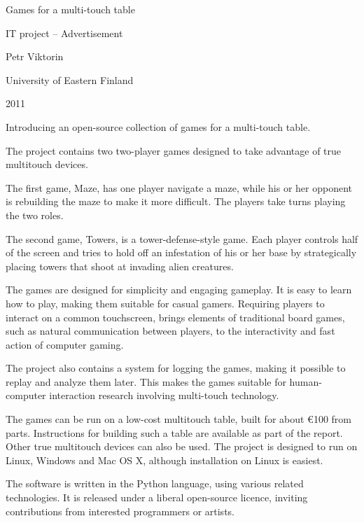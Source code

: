 \documentclass[a4paper,12pt]{article}
\begin{document}
\vspace*{3cm}

\begin{center}
{
    \huge Games for a multi-touch table

    \vspace{0.5em}

    \large IT project – Advertisement
}

\vspace{3em}

Petr Viktorin

University of Eastern Finland

2011
\end{center}

\vspace*{2.718\fill}

\newpage

Introducing an open-source collection of games for a multi-touch table.

\hspace{1em}

The project contains two two-player games designed to take advantage of
true multitouch devices.

The first game, Maze, has one player navigate a maze, while his or her opponent
is rebuilding the maze to make it more difficult.
The players take turns playing the two roles.

The second game, Towers, is a tower-defense-style game. Each player controls
half of the screen and tries to hold off an infestation of his or her base by
strategically placing towers that shoot at invading alien creatures.

The games are designed for simplicity and engaging gameplay.
It is easy to learn how to play, making them suitable for casual gamers.
Requiring players to interact on a common touchscreen, brings elements of
traditional board games, such as natural communication between players, to the
interactivity and fast action of computer gaming.

The project also contains a system for logging the games, making it possible to
replay and analyze them later.
This makes the games suitable for human-computer interaction research involving
multi-touch technology.

The games can be run on a low-cost multitouch table, built for about €100 from
parts.
Instructions for building such a table are available as part of the report.
Other true multitouch devices can also be used.
The project is designed to run on Linux, Windows and Mac OS X, although
installation on Linux is easiest.

The software is written in the Python language, using various related
technologies.
It is released under a liberal open-source licence, inviting contributions from
interested programmers or artists.
\end{document}
